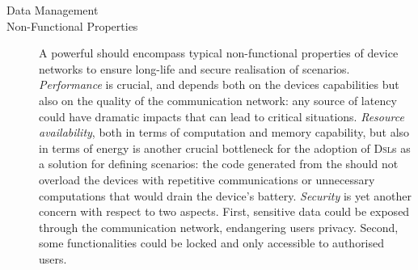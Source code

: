 \begin{description}
	\item[Data Management]  
	
	\item[Non-Functional Properties] A powerful \DSL should encompass typical non-functional properties of device networks to ensure long-life and secure realisation of scenarios. \emph{Performance} is crucial, and depends both on the devices capabilities but also on the quality of the communication network: any source of latency could have dramatic impacts that can lead to critical situations. \emph{Resource availability}, both in terms of computation and memory capability, but also in terms of energy is another crucial bottleneck for the adoption of \textsc{Dsl}s as a solution for defining scenarios: the code generated from the \DSL should not overload the devices with repetitive communications or unnecessary computations that would drain the device's battery. \emph{Security} is yet another concern with respect to two aspects. First, sensitive data could be exposed through the communication network, endangering users privacy. Second, some functionalities could be locked and only accessible to authorised users.

\end{description}

